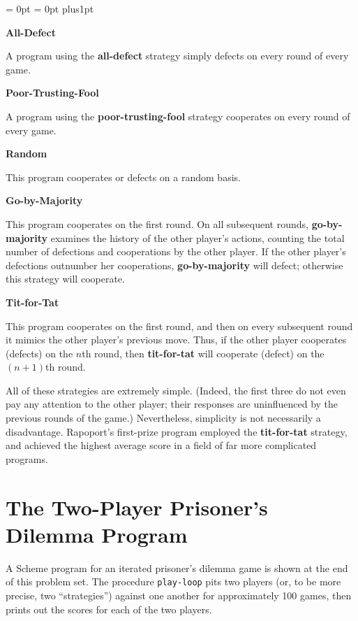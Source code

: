 {\narrower \parindent = 0pt \parskip = 0pt plus1pt

\vskip 4pt

{\bf All-Defect}

A program using the {\bf all-defect} strategy simply defects on
every round of every game.

\vskip 4pt
\goodbreak
{\bf Poor-Trusting-Fool}

A program using the {\bf poor-trusting-fool} strategy cooperates
on every round of every game.

\vskip 4pt

{\bf Random}

This program cooperates or defects on a random basis.

\vskip 4pt

{\bf Go-by-Majority}

This program cooperates on the first round. On all subsequent rounds,
{\bf go-by-majority} examines the history of the other player's
actions, counting the total number of defections and cooperations by
the other player. If the other player's defections outnumber her
cooperations, {\bf go-by-majority} will defect; otherwise this
strategy will cooperate.


\vskip 4pt

{\bf Tit-for-Tat}

This program cooperates on the first round, and then on every subsequent
round it mimics the other player's previous move. Thus, if the other
player cooperates (defects) on the $n$th round, then {\bf tit-for-tat}
will cooperate (defect) on the $(n + 1)$th round.

\vskip 4pt

}

All of these strategies are extremely simple. (Indeed, the first three
do not even pay any attention to the other player; their responses are
uninfluenced by the previous rounds of the game.)  Nevertheless,
simplicity is not necessarily a disadvantage.  Rapoport's first-prize
program employed the {\bf tit-for-tat} strategy, and achieved the
highest average score in a field of far more complicated programs.


\section{The Two-Player Prisoner's Dilemma Program}

A Scheme program for an iterated prisoner's dilemma game is shown at
the end of this problem set. The procedure {\tt play-loop} pits two
players (or, to be more precise, two ``strategies'') against one another
for approximately 100 games, then prints out the scores for each of
the two players.

